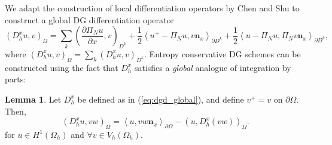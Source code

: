 \documentclass[preprint,10pt]{article}
\theoremstyle{definition}
\theoremstyle{lemma}
\newtheorem{lemma}{Lemma}
\theoremstyle{theorem}
\theoremstyle{assumption}
\newcommand{\pd}[2]{\frac{\partial#1}{\partial#2}}
\newcommand{\LRp}[1]{\left( #1 \right)}
\newcommand{\LRa}[1]{\left\langle #1 \right\rangle}
\newcommand{\Oh}{{\Omega_h}}
\begin{document}

We adapt the construction of local differentiation operators by Chen and Shu \cite{chen2017entropy} to construct a global DG differentiation operator
\begin{equation}
\LRp{D^x_h u,v}_{\Omega} = \sum_k \LRp{\pd{ \Pi_N u}{x},v}_{D^k} + \frac{1}{2}{\LRa{{u^+ - \Pi_N u}, v\bm{n}_x}_{\partial D^k} + \frac{1}{2}\LRa{{u - \Pi_Nu },\Pi_Nv \bm{n}_x}_{\partial D^k}},
\label{eq:dgd_global}
\end{equation}
where $\LRp{D^x_h u,v}_{\Omega} = \sum_k \LRp{D^x_h u,v}_{D^k}$.  
Entropy conservative DG schemes can be constructed using the fact that $D^x_h$ satisfies a \textit{global} analogue of integration by parts:
\begin{lemma}
Let $D^x_h$ be defined as in (\ref{eq:dgd_global}), and define $v^+ = v$ on $\partial \Omega$.  Then, 
\[
\LRp{D^x_h u,vw}_{\Omega} = \LRa{u,vw\bm{n}_x}_{\partial \Omega} - \LRp{u,D^x_h (vw)}_{\Omega}.
\]
for $u \in H^1(\Oh)$ and $\forall v\in V_h(\Omega_h)$.  
\label{lemma:ibp}
\end{lemma}
\end{document}
